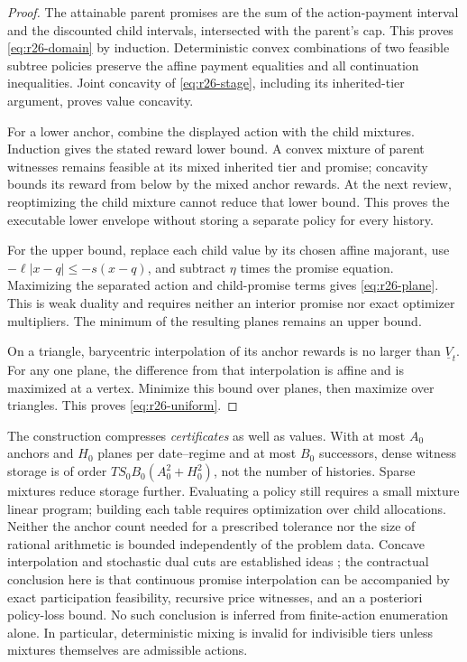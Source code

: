 \begin{proof}
The attainable parent promises are the sum of the action-payment interval and the discounted child intervals, intersected with the parent's cap. This proves \eqref{eq:r26-domain} by induction. Deterministic convex combinations of two feasible subtree policies preserve the affine payment equalities and all continuation inequalities. Joint concavity of \eqref{eq:r26-stage}, including its inherited-tier argument, proves value concavity.

For a lower anchor, combine the displayed action with the child mixtures. Induction gives the stated reward lower bound. A convex mixture of parent witnesses remains feasible at its mixed inherited tier and promise; concavity bounds its reward from below by the mixed anchor rewards. At the next review, reoptimizing the child mixture cannot reduce that lower bound. This proves the executable lower envelope without storing a separate policy for every history.

For the upper bound, replace each child value by its chosen affine majorant, use $-\ell|x-q|\leq-s(x-q)$, and subtract $\eta$ times the promise equation. Maximizing the separated action and child-promise terms gives \eqref{eq:r26-plane}. This is weak duality and requires neither an interior promise nor exact optimizer multipliers. The minimum of the resulting planes remains an upper bound.

On a triangle, barycentric interpolation of its anchor rewards is no larger than $\underline V_t$. For any one plane, the difference from that interpolation is affine and is maximized at a vertex. Minimize this bound over planes, then maximize over triangles. This proves \eqref{eq:r26-uniform}.
\end{proof}

The construction compresses \emph{certificates} as well as values. With at most $A_0$ anchors and $H_0$ planes per date--regime and at most $B_0$ successors, dense witness storage is of order $TS_0B_0(A_0^2+H_0^2)$, not the number of histories. Sparse mixtures reduce storage further. Evaluating a policy still requires a small mixture linear program; building each table requires optimization over child allocations. Neither the anchor count needed for a prescribed tolerance nor the size of rational arithmetic is bounded independently of the problem data. Concave interpolation and stochastic dual cuts are established ideas \citep{PereiraPinto1991}; the contractual conclusion here is that continuous promise interpolation can be accompanied by exact participation feasibility, recursive price witnesses, and an a posteriori policy-loss bound. No such conclusion is inferred from finite-action enumeration alone. In particular, deterministic mixing is invalid for indivisible tiers unless mixtures themselves are admissible actions.

